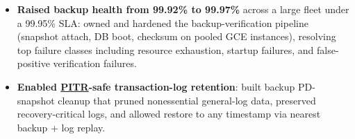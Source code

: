 \documentclass{resume-v2}
\begin{document}
\begin{itemize}
  \item \textbf{Raised backup health from 99.92\% to 99.97\%} across a large fleet under a 99.95\% SLA: owned and hardened the backup-verification pipeline (snapshot attach, DB boot, checksum on pooled GCE instances), resolving top failure classes including resource exhaustion, startup failures, and false-positive verification failures.
  \item \textbf{Enabled \href{https://cloud.google.com/sql/docs/mysql/backup-recovery/manage-standard-backups\#point-in-time_recovery}{PITR}-safe transaction-log retention}: built backup PD-snapshot cleanup that pruned nonessential general-log data, preserved recovery-critical logs, and allowed restore to any timestamp via nearest backup + log replay.

\end{itemize}
\end{document}
